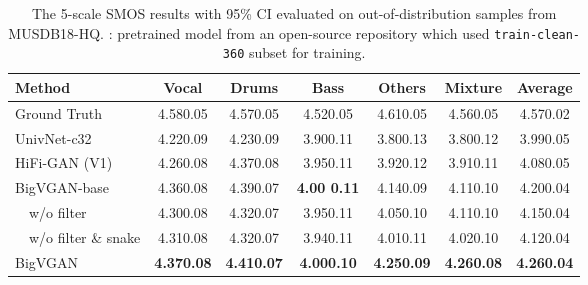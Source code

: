\documentclass{article} \usepackage{iclr2023_conference,times}
\theoremstyle{plain}
\theoremstyle{definition}
\theoremstyle{remark}
\begin{document}
\begin{table*}[t]
\vspace{-.2cm}
\caption{\footnotesize 
The 5-scale SMOS results with 95\% CI evaluated on out-of-distribution samples from MUSDB18-HQ. : pretrained model from an open-source repository which used \texttt{train-clean-360} subset for training.}
\label{tab:musdb-hq}
\begin{center}
\begin{small}
\begin{tabular}{lccccc|c}
\toprule
Method & Vocal & Drums & Bass & Others & Mixture & Average \\
\midrule
Ground Truth & 4.580.05 & 4.570.05 & 4.520.05 & 4.610.05 & 4.560.05 &  4.570.02 \\
\midrule
UnivNet-c32 & 4.220.09 & 4.230.09 & 3.900.11 & 3.800.13 & 3.800.12 & 3.990.05 \\
HiFi-GAN (V1) & 4.260.08 & 4.370.08 & 3.950.11 & 3.920.12 & 3.910.11 & 4.080.05 \\
\midrule
BigVGAN-base & 4.360.08 & 4.390.07 & \textbf{4.00 0.11} & 4.140.09 & 4.110.10 & 4.200.04 \\
\ \ w/o filter & 4.300.08 & 4.320.07 & 3.950.11 & 4.050.10 & 4.110.10 & 4.150.04 \\
\ \ w/o filter \& snake & 4.310.08 & 4.320.07 & 3.940.11 & 4.010.11 & 4.020.10 & 4.120.04 \\
\midrule
BigVGAN & \textbf{4.370.08} & \textbf{4.410.07} & \textbf{4.000.10} & \textbf{4.250.09} & \textbf{4.260.08} & \textbf{4.260.04} \\
\bottomrule
\end{tabular}
\end{small}
\end{center}
\vskip -0.1in
\end{table*}


\vspace{-.2cm}
\end{document}
